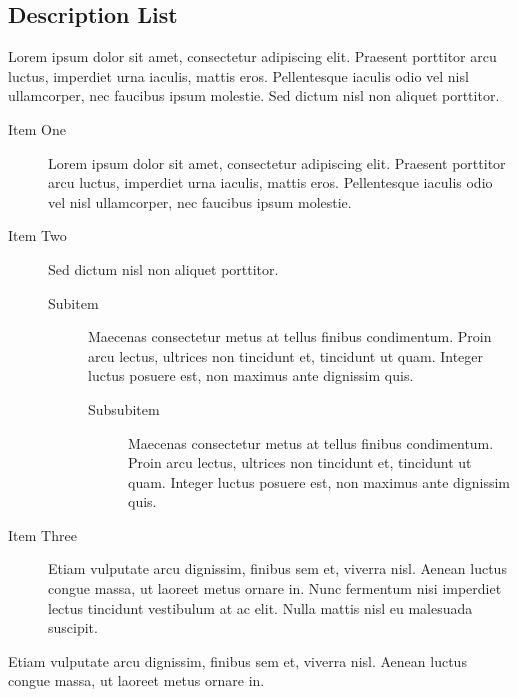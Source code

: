 \documentclass[
	a4paper, %
	11pt, %
]{DC_Report}
\begin{document}

\subsection{Description List}

Lorem ipsum dolor sit amet, consectetur adipiscing elit. Praesent porttitor arcu luctus, imperdiet urna iaculis, mattis eros. Pellentesque iaculis odio vel nisl ullamcorper, nec faucibus ipsum molestie. Sed dictum nisl non aliquet porttitor.

\begin{description}
	\item[Item One] Lorem ipsum dolor sit amet, consectetur adipiscing elit. Praesent porttitor arcu luctus, imperdiet urna iaculis, mattis eros. Pellentesque iaculis odio vel nisl ullamcorper, nec faucibus ipsum molestie.
	\item[Item Two] Sed dictum nisl non aliquet porttitor.
	\begin{description}
		\item[Subitem] Maecenas consectetur metus at tellus finibus condimentum. Proin arcu lectus, ultrices non tincidunt et, tincidunt ut quam. Integer luctus posuere est, non maximus ante dignissim quis.
		\begin{description}
			\item[Subsubitem] Maecenas consectetur metus at tellus finibus condimentum. Proin arcu lectus, ultrices non tincidunt et, tincidunt ut quam. Integer luctus posuere est, non maximus ante dignissim quis.
	\end{description}
	\end{description}
	\item[Item Three] Etiam vulputate arcu dignissim, finibus sem et, viverra nisl. Aenean luctus congue massa, ut laoreet metus ornare in. Nunc fermentum nisi imperdiet lectus tincidunt vestibulum at ac elit. Nulla mattis nisl eu malesuada suscipit.
\end{description}

Etiam vulputate arcu dignissim, finibus sem et, viverra nisl. Aenean luctus congue massa, ut laoreet metus ornare in.
\end{document}

